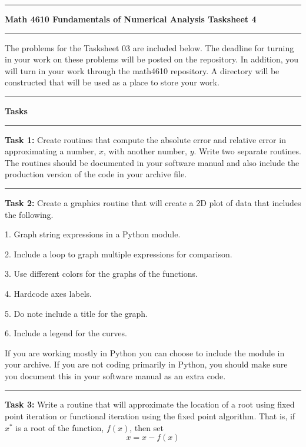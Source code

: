 \documentclass[10pt,fleqn]{article}
\begin{document}
\vskip0.1in\hrule\vskip0.1in \noindent
{\bf{\Large Math 4610 Fundamentals of Numerical Analysis Tasksheet 4}}
\vskip0.1in\hrule\vskip0.1in \noindent
The problems for the Tasksheet 03 are included below. The deadline for turning
in your work on these problems will be posted on the repository. In addition,
you will turn in your work through the math4610 repository. A directory will be
constructed that will be used as a place to store your work.
\vskip0.1in\hrule\vskip0.1in \noindent
{\bf{\large Tasks}}
\vskip0.1in\hrule\vskip0.1in \noindent
\begin{trivlist}
  \item[\bf Task 1:]
    Create routines that compute the absolute error and relative error in
    approximating a number, \(x\), with another number, \(y\). Write two
    separate routines. The routines should be documented in your software manual
    and also include the production version of the code in your archive file.
\vskip0.1in\hrule\vskip0.1in \noindent
  \item[\bf Task 2:] Create a graphics routine that will create a 2D plot of 
    data that includes the following.
    \begin{trivlist}
      \item[1.] Graph string expressions in a Python module. 
      \item[2.] Include a loop to graph multiple expressions for comparison.
      \item[3.] Use different colors for the graphs of the functions.
      \item[4.] Hardcode axes labels.
      \item[5.] Do note include a title for the graph.
      \item[6.] Include a legend for the curves.
    \end{trivlist}
    If you are working mostly in Python you can choose to include the module in
    your archive. If you are not coding primarily in Python, you should make
    sure you document this in your software manual as an extra code.
\vskip0.1in\hrule\vskip0.1in \noindent
  \item[\bf Task 3:] 
    Write a routine that will approximate the location of a root using fixed
    point iteration or functional iteration using the fixed point algorithm.
    That is, if \(x^*\) is a root of the function, \(f(x)\), then set
    \[
      x = x - f(x)
\]
\end{trivlist}
\end{document}
